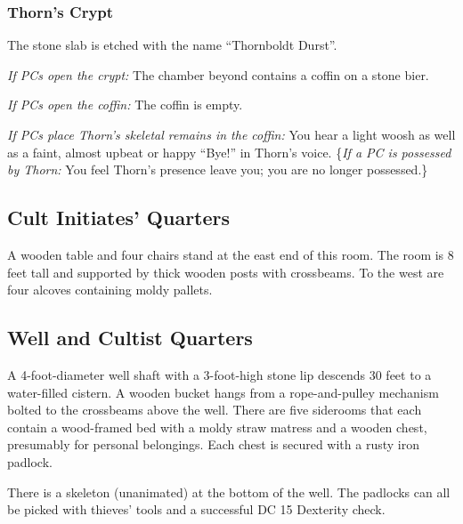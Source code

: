 \subsubsection{Thorn's Crypt}
\begin{readout}
  The stone slab is etched with the name ``Thornboldt Durst''.
  
  \textit{If PCs open the crypt:} The chamber beyond contains a coffin on a stone bier.
  
  \textit{If PCs open the coffin:} The coffin is empty.
  
  \textit{If PCs place Thorn's skeletal remains in the coffin:} You hear a light woosh as well as a faint,
  almost upbeat or happy ``Bye!'' in Thorn's voice. \{\textit{If a PC is possessed by Thorn:} You feel Thorn's
  presence leave you; you are no longer possessed.\}
\end{readout}

\begin{arealinks}
\end{arealinks}


\pagebreak
\subsection{Cult Initiates' Quarters}
\label{sec:CultInitiatesQuarters}
\begin{readout}
  A wooden table and four chairs stand at the east end of this room. The room is 8 feet tall and supported by
  thick wooden posts with crossbeams. To the west are four alcoves containing moldy pallets.
\end{readout}

\begin{arealinks}
\end{arealinks}


\pagebreak
\subsection{Well and Cultist Quarters}
\label{sec:WellAndCultistQuarters}
\begin{readout}
  A 4-foot-diameter well shaft with a 3-foot-high stone lip descends 30 feet to a water-filled cistern.
  A wooden bucket hangs from a rope-and-pulley mechanism bolted to the crossbeams above the well. There are
  five siderooms that each contain a wood-framed bed with a moldy straw matress and a wooden chest, presumably
  for personal belongings. Each chest is secured with a rusty iron padlock.
\end{readout}
There is a skeleton (unanimated) at the bottom of the well. The padlocks can all be picked with thieves' tools 
and a successful DC 15 Dexterity check.

